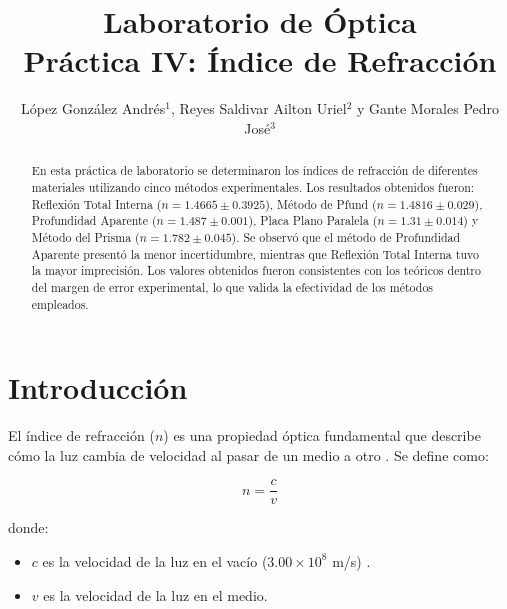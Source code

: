 \documentclass[article,12pt]{elsarticle}
\begin{document}

\begin{frontmatter}
    \title{Laboratorio de Óptica \\  Práctica  IV: Índice de Refracción}
    \author{López González Andrés$^1$, Reyes Saldivar Ailton Uriel$^2$ y Gante Morales Pedro José$^3$} %
    \address{$^1$ Facultad de Ciencias, Universidad Nacional Autónoma de México, M\'exico CDMX.}

\begin{abstract}
En esta práctica de laboratorio se determinaron los índices de refracción de diferentes materiales utilizando cinco métodos experimentales. Los resultados obtenidos fueron: Reflexión Total Interna ($n = 1.4665 \pm 0.3925$), Método de Pfund ($n = 1.4816 \pm 0.029$), Profundidad Aparente ($n = 1.487 \pm 0.001$), Placa Plano Paralela ($n = 1.31 \pm 0.014$) y Método del Prisma ($n = 1.782 \pm 0.045$). Se observó que el método de Profundidad Aparente presentó la menor incertidumbre, mientras que Reflexión Total Interna tuvo la mayor imprecisión. Los valores obtenidos fueron consistentes con los teóricos dentro del margen de error experimental, lo que valida la efectividad de los métodos empleados.

\end{abstract}
    
\end{frontmatter}

\vspace{0.5cm} 



\section{Introducción}
El índice de refracción ($n$) es una propiedad óptica fundamental que describe cómo la luz cambia de velocidad al pasar de un medio a otro \cite{indice_ref}. Se define como:

\begin{mdframed}
\begin{equation}
    n = \frac{c}{v}
\end{equation}
\end{mdframed}

donde:
\begin{itemize}
    \item $c$ es la velocidad de la luz en el vacío ($3.00 \times 10^8$ m/s) \cite{snell}.
    \item $v$ es la velocidad de la luz en el medio.
\end{itemize}
\end{document}
